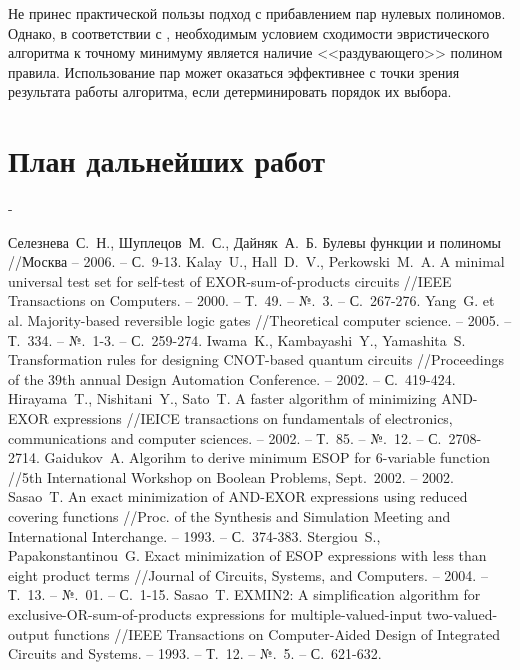 \documentclass[a4paper,12pt,titlepage,finall]{article}
\begin{document}
Не принес практической пользы подход с прибавлением пар нулевых полиномов. Однако, в соответствии с \cite{convergence}, необходимым условием сходимости эвристического алгоритма к точному минимуму является наличие <<раздувающего>> полином правила. Использование пар может оказаться эффективнее с точки зрения результата работы алгоритма, если детерминировать порядок их выбора.

\newpage

\section{План дальнейших работ}

-

\newpage

\begin{raggedright}
\begin{thebibliography}{99}
     Селезнева~С.~Н., Шуплецов~М.~С., Дайняк~А.~Б. Булевы функции и полиномы //Москва – 2006. – С.~9-13.
     Kalay~U., Hall~D.~V., Perkowski~M.~A. A minimal universal test set for self-test of EXOR-sum-of-products circuits //IEEE Transactions on Computers. – 2000. – Т.~49. – №.~3. – С.~267-276.
     Yang~G. et al. Majority-based reversible logic gates //Theoretical computer science. – 2005. – Т.~334. – №.~1-3. – С.~259-274.
     Iwama~K., Kambayashi~Y., Yamashita~S. Transformation rules for designing CNOT-based quantum circuits //Proceedings of the 39th annual Design Automation Conference. – 2002. – С.~419-424.
     Hirayama~T., Nishitani~Y., Sato~T. A faster algorithm of minimizing AND-EXOR expressions //IEICE transactions on fundamentals of electronics, communications and computer sciences. – 2002. – Т.~85. – №.~12. – С.~2708-2714.
     Gaidukov~A. Algorihm to derive minimum ESOP for 6-variable function //5th International Workshop on Boolean Problems, Sept.~2002. – 2002.
     Sasao~T. An exact minimization of AND-EXOR expressions using reduced covering functions //Proc. of the Synthesis and Simulation Meeting and International Interchange. – 1993. – С.~374-383.
     Stergiou~S., Papakonstantinou~G. Exact minimization of ESOP expressions with less than eight product terms //Journal of Circuits, Systems, and Computers. – 2004. – Т.~13. – №.~01. – С.~1-15.
     Sasao~T. EXMIN2: A simplification algorithm for exclusive-OR-sum-of-products expressions for multiple-valued-input two-valued-output functions //IEEE Transactions on Computer-Aided Design of Integrated Circuits and Systems. – 1993. – Т.~12. – №.~5. – С.~621-632.

\end{thebibliography}
\end{raggedright}
\end{document}
